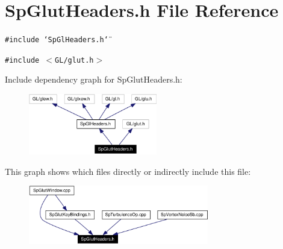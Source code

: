 \section{Sp\-Glut\-Headers.h File Reference}
\label{SpGlutHeaders_8h}
{\tt \#include \char`\"{}Sp\-Gl\-Headers.h\char`\"{}}\par
{\tt \#include $<$GL/glut.h$>$}\par


Include dependency graph for Sp\-Glut\-Headers.h:\begin{figure}[H]
\begin{center}
\leavevmode
\includegraphics[width=159pt]{SpGlutHeaders_8h__incl}
\end{center}
\end{figure}


This graph shows which files directly or indirectly include this file:\begin{figure}[H]
\begin{center}
\leavevmode
\includegraphics[width=223pt]{SpGlutHeaders_8h__dep__incl}
\end{center}
\end{figure}
